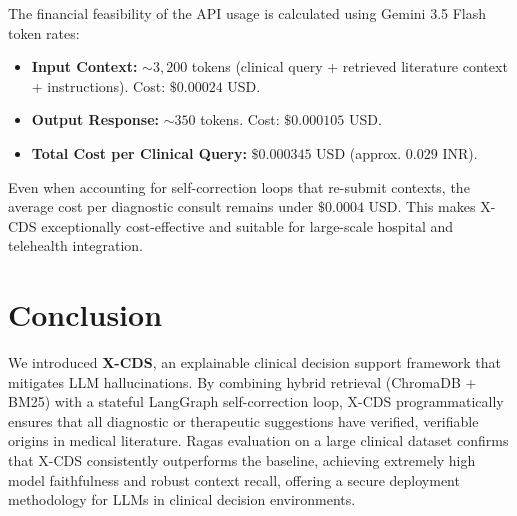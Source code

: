 \documentclass[sn-mathphys,Numbered]{sn-jnl}%
\begin{document}
The financial feasibility of the API usage is calculated using Gemini 3.5 Flash token rates:
\begin{itemize}
    \item \textbf{Input Context:} $\sim3,200$ tokens (clinical query + retrieved literature context + instructions). Cost: $\$0.00024$ USD.
    \item \textbf{Output Response:} $\sim350$ tokens. Cost: $\$0.000105$ USD.
    \item \textbf{Total Cost per Clinical Query:} $\$0.000345$ USD (approx. $0.029$ INR).
\end{itemize}
Even when accounting for self-correction loops that re-submit contexts, the average cost per diagnostic consult remains under $\$0.0004$ USD. This makes X-CDS exceptionally cost-effective and suitable for large-scale hospital and telehealth integration.

\section{Conclusion}\label{sec5}
We introduced \textbf{X-CDS}, an explainable clinical decision support framework that mitigates LLM hallucinations. By combining hybrid retrieval (ChromaDB + BM25) with a stateful LangGraph self-correction loop, X-CDS programmatically ensures that all diagnostic or therapeutic suggestions have verified, verifiable origins in medical literature. Ragas evaluation on a large clinical dataset confirms that X-CDS consistently outperforms the baseline, achieving extremely high model faithfulness and robust context recall, offering a secure deployment methodology for LLMs in clinical decision environments.
\end{document}
